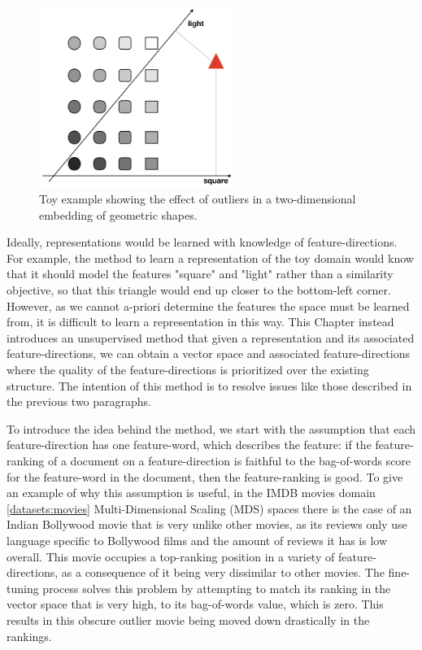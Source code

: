 \begin{figure}
	\centering
	\includegraphics[width=180pt]{images/shapes}
	\caption{Toy example showing the effect of outliers in a two-dimensional embedding of geometric shapes.}
	\label{fig:toyExample}
\end{figure}

Ideally, representations would be learned with knowledge of feature-directions. For example, the method to learn a representation of the toy domain would know that it should model the features "square" and "light" rather than a similarity objective, so that this triangle would end up closer to the bottom-left corner. However, as we cannot a-priori determine the features the space must be learned from, it is difficult to learn a representation in this way. This Chapter instead introduces an unsupervised method that given a representation and its associated feature-directions, we can obtain a  vector space and associated feature-directions where the quality of the feature-directions is prioritized over the existing structure. The intention of this method is to resolve issues like those described in the previous two paragraphs.

To introduce the idea behind the method, we start with the assumption that each feature-direction has one feature-word, which describes the feature: if the feature-ranking of a document on a feature-direction is faithful to the bag-of-words score for the feature-word in the document, then the feature-ranking is good. To give an example of why this assumption is useful, in the IMDB movies domain \ref{datasets:movies} Multi-Dimensional Scaling (MDS) spaces there is the case of an Indian Bollywood movie that is very unlike other movies, as its reviews only use language specific to Bollywood films and the amount of reviews it has is low overall. This movie occupies a top-ranking position in a variety of feature-directions,  as a consequence of it being very dissimilar to other movies. The fine-tuning process solves this problem by attempting to match its  ranking in the vector space that is very high, to its bag-of-words value, which is zero. This results in this obscure outlier movie being moved down drastically in the rankings. 

